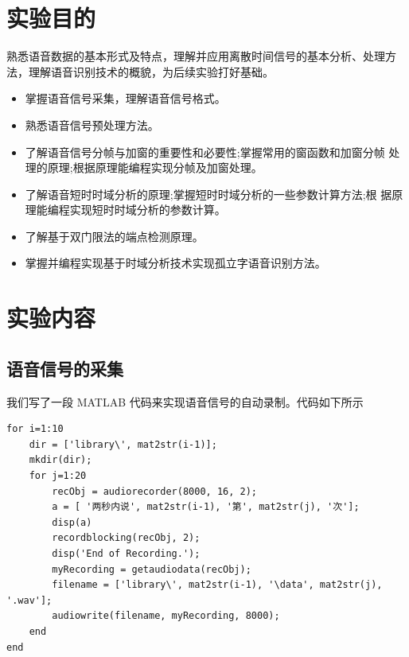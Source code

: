 
\hypertarget{ux5b9eux9a8cux76eeux7684}{%
\section{实验目的}\label{ux5b9eux9a8cux76eeux7684}}

熟悉语音数据的基本形式及特点，理解并应用离散时间信号的基本分析、处理方法，理解语音识别技术的概貌，为后续实验打好基础。

\begin{itemize}
\item 掌握语音信号采集，理解语音信号格式。
\item 熟悉语音信号预处理方法。
\item 了解语音信号分帧与加窗的重要性和必要性;掌握常用的窗函数和加窗分帧
处理的原理;根据原理能编程实现分帧及加窗处理。
\item 了解语音短时时域分析的原理;掌握短时时域分析的一些参数计算方法;根
据原理能编程实现短时时域分析的参数计算。
\item 了解基于双门限法的端点检测原理。
\item 掌握并编程实现基于时域分析技术实现孤立字语音识别方法。
\end{itemize}

\hypertarget{ux5b9eux9a8cux5185ux5bb9}{%
\section{实验内容}\label{ux5b9eux9a8cux5185ux5bb9}}

\hypertarget{ux8bedux97f3ux4fe1ux53f7ux7684ux91c7ux96c6}{%
\subsection{语音信号的采集}\label{ux8bedux97f3ux4fe1ux53f7ux7684ux91c7ux96c6}}

我们写了一段 MATLAB 代码来实现语音信号的自动录制。代码如下所示

\begin{lstlisting}[style=Matlab-editor]
% MATLAB code to record audio signal
for i=1:10
    dir = ['library\', mat2str(i-1)];
    mkdir(dir);
    for j=1:20
        recObj = audiorecorder(8000, 16, 2);
        a = [ '两秒内说', mat2str(i-1), '第', mat2str(j), '次'];
        disp(a)
        recordblocking(recObj, 2);
        disp('End of Recording.');
        myRecording = getaudiodata(recObj);
        filename = ['library\', mat2str(i-1), '\data', mat2str(j), '.wav'];
        audiowrite(filename, myRecording, 8000);
    end
end
\end{lstlisting}

